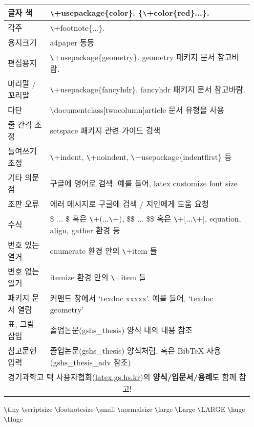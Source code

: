 \documentclass[11pt]{article}
\begin{document}
\begin{table}[h]
\begin{tabular}{|p{}|p{}|}
		\hline
		글자 색 & \verb+\+usepackage\{color\}. \{\verb+\+color\{red\}...\}. \\
		\hline
		각주 & \verb+\+footnote\{...\}.  \\
		\hline
		용지크기 & a4paper 등등 \\
		\hline
		편집용지 & \verb+\+usepackage\{geometry\}. geometry 패키지 문서 참고바람. \\
		\hline
		머리말 / 꼬리말 & \verb+\+usepackage\{fancyhdr\}. fancyhdr 패키지 문서 참고바람. \\
		\hline
		다단 & \textbackslash documentclass[twocolumn]{article} 문서 유형을 사용\\
		\hline
		줄 간격 조정 & setspace 패키지 관련 가이드 검색 \\
		\hline
		들여쓰기 조정 & \verb+\+indent, \verb+\+noindent,  \verb+\+usepackage\{indentfirst\} 등 \\
		\hline
		기타 의문점 & 구글에 영어로 검색. 예를 들어, latex customize font size \\
		\hline
		조판 오류 & 에러 메시지로 구글에 검색 / 지인에게 도움 요청 \\
		\hline
		수식 & \$ ... \$ 혹은 \verb+\+(...\verb+\+), \$\$ ... \$\$ 혹은 \verb+\+[...\verb+\+], equation, align, gather 환경 등 \\
		\hline
		번호 있는 열거 & enumerate 환경 안의 \verb+\+item 들\\
		\hline
		번호 없는 열거 & itemize 환경 안의 \verb+\+item 들 \\
		\hline
		패키지 문서 열람 & 커맨드 창에서 `texdoc xxxxx'. 예를 들어, `texdoc geometry' \\
		\hline
		표, 그림 삽입 & 졸업논문(gshs\_thesis) 양식 내의 내용 참조 \\
		\hline
		참고문헌 입력 & 졸업논문(gshs\_thesis) 양식처럼, 혹은 BibTeX 사용(gshs\_thesis\_adv 참조) \\
		\hline
		\multicolumn{2}{|c|}{경기과학고 텍 사용자협회(\url{latex.gs.hs.kr})의 \textbf{양식/입문서/용례}도 함께 참고!} \\
		\hline
	\end{tabular}
\end{table}
{\tiny \verb+\+tiny} {\scriptsize \verb+\+scriptsize} {\footnotesize \verb+\+footnotesize} {\small \verb+\+small} {\normalsize \verb+\+normalsize} {\large \verb+\+large} {\Large \verb+\+Large} {\LARGE \verb+\+LARGE} {\huge \verb+\+huge} {\Huge \verb+\+Huge}
\end{document}
